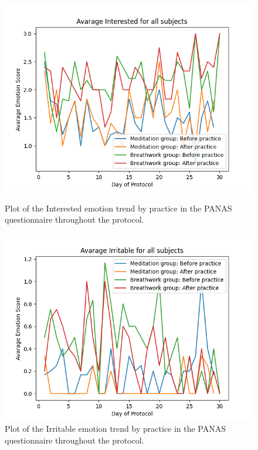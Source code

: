 \begin{figure}
    \centering
    \begin{minipage}{0.49\linewidth}
        \includegraphics[width=\linewidth]{Figures/panas/emotions/Interested.png}
        \caption{Plot of the Interested emotion trend by practice in the PANAS questionnaire throughout the protocol.}
        \label{fig:interested_by_practice}
    \end{minipage}
    \hfill %
    \begin{minipage}{0.49\linewidth}
        \includegraphics[width=\linewidth]{Figures/panas/emotions/Irritable.png}
        \caption{Plot of the Irritable emotion trend by practice in the PANAS questionnaire throughout the protocol.}
        \label{fig:irritable_by_practice}
    \end{minipage}
\end{figure} %

